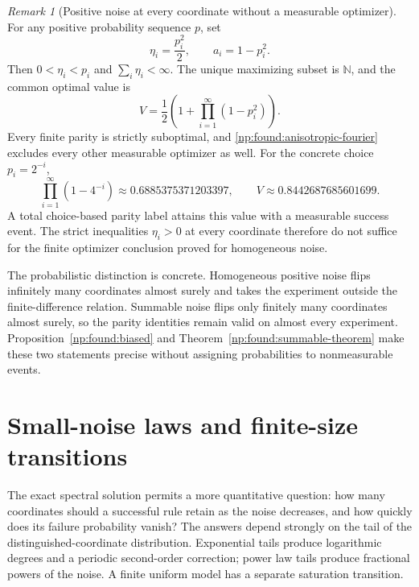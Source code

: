 \documentclass[11pt,a4paper]{article}
\theoremstyle{definition}
\theoremstyle{remark}
\newtheorem{remark}[theorem]{Remark}
\newcommand{\N}{\mathbb N}
\begin{document}
\begin{remark}[Positive noise at every coordinate without a measurable optimizer]
\label{np:found:dyadic-example}
For any positive probability sequence $p$, set
\[
 \eta_i=\frac{p_i^2}{2},\qquad a_i=1-p_i^2.
\]
Then $0<\eta_i<p_i$ and $\sum_i\eta_i<\infty$.
The unique maximizing subset is $\N$, and the common optimal value is
\[
 V=\frac12\left(1+\prod_{i=1}^{\infty}(1-p_i^2)\right).
\]
Every finite parity is strictly suboptimal, and
\eqref{np:found:anisotropic-fourier} excludes every other measurable
optimizer as well.  For the concrete choice $p_i=2^{-i}$,
\[
 \prod_{i=1}^{\infty}(1-4^{-i})
 \approx0.6885375371203397,
 \qquad
 V\approx0.8442687685601699.
\]
A total choice-based parity label attains this value with a measurable
success event.  The strict inequalities $\eta_i>0$ at every coordinate
therefore do not suffice for the finite optimizer conclusion proved
for homogeneous noise.
\end{remark}

The probabilistic distinction is concrete.  Homogeneous positive noise
flips infinitely many coordinates almost surely and takes the experiment
outside the finite-difference relation.  Summable noise flips only
finitely many coordinates almost surely, so the parity identities remain
valid on almost every experiment.  Proposition~\ref{np:found:biased}
and Theorem~\ref{np:found:summable-theorem} make these two statements
precise without assigning probabilities to nonmeasurable events.

\section{Small-noise laws and finite-size transitions}
\label{np:asym:section}

The exact spectral solution permits a more quantitative question: how many
coordinates should a successful rule retain as the noise decreases, and how
quickly does its failure probability vanish?  The answers depend strongly on
the tail of the distinguished-coordinate distribution.  Exponential tails
produce logarithmic degrees and a periodic second-order correction; power
law tails produce fractional powers of the noise.  A finite uniform model
has a separate saturation transition.
\end{document}
